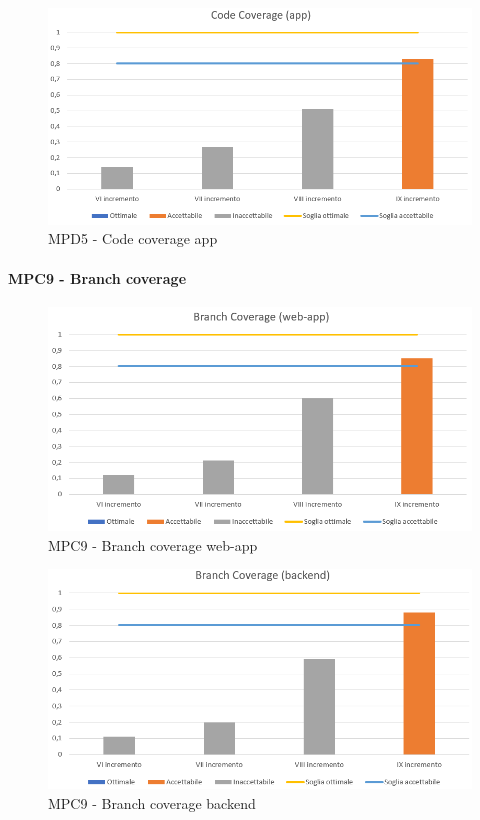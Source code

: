   \begin{figure}[h!]
    \centering
      \includegraphics[scale=1]{Immagini/CodeCov APPA.PNG}
    \caption{MPD5 - Code coverage app}
  \end{figure}


  \clearpage
  \paragraph{MPC9 - Branch coverage}
  \begin{figure}[h!]
    \centering
      \includegraphics[scale=1]{Immagini/BranchCov WAA.PNG}
    \caption{MPC9 - Branch coverage web-app}
  \end{figure}

  \begin{figure}[h!]
    \centering
      \includegraphics[scale=1]{Immagini/BranchCov BEA.PNG}
    \caption{MPC9 - Branch coverage backend}
  \end{figure}


